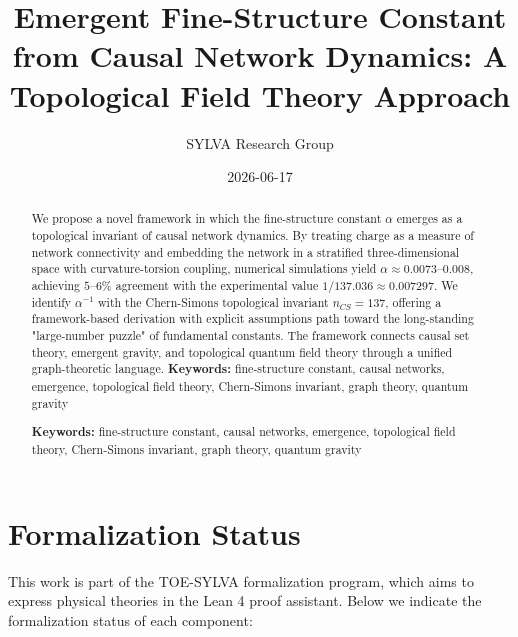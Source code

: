 \documentclass[11pt,a4paper]{article}
\title{Emergent Fine-Structure Constant from Causal Network Dynamics: A Topological Field Theory Approach}
\author{SYLVA Research Group}
\date{2026-06-17}
\theoremstyle{plain}
\theoremstyle{definition}
\begin{document}
\maketitle

\begin{abstract}
We propose a novel framework in which the fine-structure constant $\alpha$ emerges as a topological invariant of causal network dynamics. By treating charge as a measure of network connectivity and embedding the network in a stratified three-dimensional space with curvature-torsion coupling, numerical simulations yield $\alpha \approx 0.0073\text{--}0.008$, achieving $5\text{--}6\%$ agreement with the experimental value $1/137.036 \approx 0.007297$. We identify $\alpha^{-1}$ with the Chern-Simons topological invariant $n_{CS} = 137$, offering a framework-based derivation with explicit assumptions path toward the long-standing "large-number puzzle" of fundamental constants. The framework connects causal set theory, emergent gravity, and topological quantum field theory through a unified graph-theoretic language.
\textbf{Keywords:} fine-structure constant, causal networks, emergence, topological field theory, Chern-Simons invariant, graph theory, quantum gravity

\textbf{Keywords:} fine-structure constant, causal networks, emergence, topological field theory, Chern-Simons invariant, graph theory, quantum gravity
\end{abstract}

\tableofcontents
\newpage

\textemdash{}

\section{Formalization Status}

This work is part of the TOE-SYLVA formalization program, which aims to express physical theories in the Lean 4 proof assistant. Below we indicate the formalization status of each component:
\end{document}
